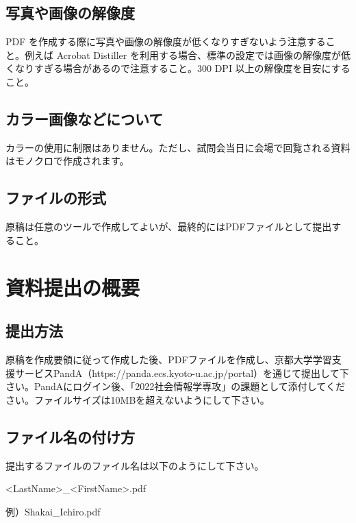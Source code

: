 \documentclass[fontsize=10.5bp]{jlreq}
\begin{document}
\subsection{写真や画像の解像度}
PDF を作成する際に写真や画像の解像度が低くなりすぎないよう注意すること。例えば Acrobat Distiller を利用する場合、標準の設定では画像の解像度が低くなりすぎる場合があるので注意すること。300 DPI 以上の解像度を目安にすること。

\subsection{カラー画像などについて}
カラーの使用に制限はありません。ただし、試問会当日に会場で回覧される資料はモノクロで作成されます。

\subsection{ファイルの形式}
原稿は任意のツールで作成してよいが、最終的にはPDFファイルとして提出すること。

\section{資料提出の概要}
\subsection{提出方法}
原稿を作成要領に従って作成した後、PDFファイルを作成し、京都大学学習支援サービスPandA（https://panda.ecs.kyoto-u.ac.jp/portal）を通じて提出して下さい。PandAにログイン後、「2022社会情報学専攻」の課題として添付してください。ファイルサイズは10MBを超えないようにして下さい。

\subsection{ファイル名の付け方}
提出するファイルのファイル名は以下のようにして下さい。

\qquad \qquad <LastName>\_<FirstName>.pdf

\qquad \qquad \quad 例）Shakai\_Ichiro.pdf
\end{document}

